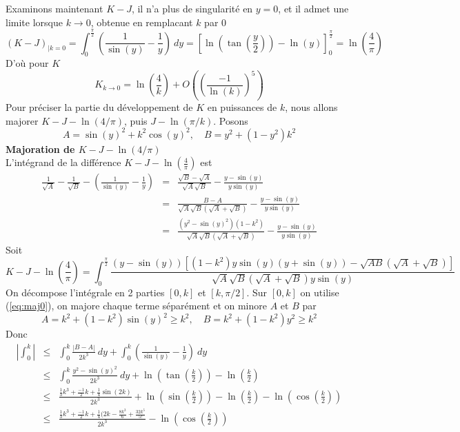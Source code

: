 \documentclass[a4paper,11pt]{article}
\begin{document}
\begin{giacjshere}
Examinons maintenant $K-J$, il n'a plus de singularit\'e en $y=0$, et il admet une limite
lorsque $k \rightarrow 0$, obtenue en remplacant $k$ par 0
\[ (K-J)_{|k=0} = \int_0^{\frac{\pi}{2}} \left(\frac{1}{\sin(y)}-\frac{1}{y}\right)
\ dy = \left[\ln\left(\tan\left(\frac{y}{2}\right)\right) - \ln(y) \right]_0^{\frac{\pi}{2}} =
\ln(\frac{4}{\pi})\]
D'o\`u pour $K$
\[ K_{k \rightarrow 0} = \ln\left(\frac{4}{k}\right) + O( \left(\frac{-1}{\ln(k)}\right)^5)\]
Pour pr\'eciser la partie du d\'eveloppement de $K$ en puissances de $k$, nous allons
majorer $K-J-\ln(4/\pi)$, puis $J-\ln(\pi/k)$.
Posons
\[ A=\sin(y)^2+k^2 \cos(y)^2, \quad B=y^2+(1-y^2)k^2\]
{\bf Majoration de $K-J-\ln(4/\pi)$}\\
L'int\'egrand de la diff\'erence $K-J-\ln(\frac{4}{\pi})$ est
\begin{eqnarray}  
\frac{1}{\sqrt{A}} - \frac{1}{\sqrt{B}} - 
\left( \frac{1}{\sin(y)}-\frac{1}{y} \right)
&= &
\frac{\sqrt{B}-\sqrt{A}}{\sqrt{A} \sqrt{B}} -
\frac{y-\sin(y)}{y\sin(y)} 
 \\
&= &
\frac{B-A}{\sqrt{A} \sqrt{B} (\sqrt{A}+\sqrt{B})} -
\frac{y-\sin(y)}{y\sin(y)} \label{eq:maj0}
 \\
&=& \frac{(y^2-\sin(y)^2)(1-k^2)}{\sqrt{A} \sqrt{B} (\sqrt{A}+\sqrt{B})}
- \frac{y-\sin(y)}{y\sin(y)} \label{eq:maj1}
\end{eqnarray}
Soit
\begin{equation} \label{eq:maj2}
 K-J-\ln(\frac{4}{\pi})= \int_0^{\frac{\pi}{2}} 
\frac{(y-\sin(y))[(1-k^2)y \sin(y)(y+\sin(y))-\sqrt{AB}(\sqrt{A}+\sqrt{B})]}
{\sqrt{A} \sqrt{B} (\sqrt{A}+\sqrt{B})y\sin(y)}
\end{equation}
On décompose l'intégrale en 2 parties $[0,k]$ et $[k,\pi/2]$.
Sur $[0,k]$ on utilise (\ref{eq:maj0}), on majore chaque terme séparément
et on minore $A$ et $B$ par
\[ A=k^2+(1-k^2)\sin(y)^2 \geq k^2, \quad B=k^2+(1-k^2)y^2 \geq k^2\]
Donc
\begin{eqnarray*} 
| \int_0^{k} | &\leq &\int_0^k \frac{|B-A|}{2k^3} \ dy + \int_0^k ( \frac{1}{\sin(y)}-\frac{1}{y} ) 
\ dy \\
&\leq& \int_0^k \frac{y^2-\sin(y)^2}{2k^3} \ dy + \ln (\tan(\frac{k}{2})) -\ln(\frac{k}{2}) \\
&\leq & \frac{\frac{1}{3} k^{3}+\frac{-1}{2} k+\frac{1}{4} \sin(2 k)}{2 k^{3}} 
+ \ln (\sin(\frac{k}{2})) -\ln(\frac{k}{2}) - \ln (\cos(\frac{k}{2}))
\\
&\leq & \frac{\frac{1}{3} k^{3}+\frac{-1}{2} k+\frac{1}{4} (2k-\frac{8k^3}{6}+\frac{32k^5}{5!}}{2 k^{3}} - \ln (\cos(\frac{k}{2})) \\

\end{eqnarray*}
\end{giacjshere}
\end{document}
